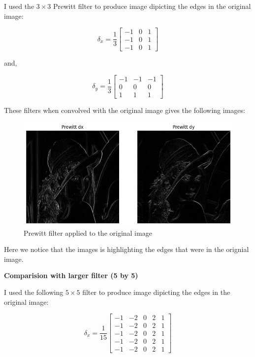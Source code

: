 I used the $3\times3$ Prewitt filter to produce image dipicting the edges in the original image:

$$\delta_x = \frac{1}{3}
\begin{bmatrix}
    -1 & 0 & 1 \\
    -1 & 0 & 1 \\
    -1 & 0 & 1
\end{bmatrix}$$

and,

$$\delta_y = \frac{1}{3}
\begin{bmatrix}
-1 & -1 & -1 \\
0 & 0 & 0 \\
1 & 1 & 1
\end{bmatrix}$$

These filters when convolved with the original image gives the following images:

\begin{figure}[H]
    \includegraphics[width=1.06\textwidth]{res/1_prewitt.png}
    \caption{Prewitt filter applied to the original image}\label{fig:1_prewitt}
\end{figure}

Here we notice that the images is highlighting the edges that were in the orignial image.

\textbf{Comparision with larger filter (5 by 5)}

I used the following $5\times5$ filter to produce image dipicting the edges in the original image:

$$\delta_x = \frac{1}{15}
\begin{bmatrix}
-1 & -2 & 0 & 2 & 1 \\
-1 & -2 & 0 & 2 & 1 \\
-1 & -2 & 0 & 2 & 1 \\
-1 & -2 & 0 & 2 & 1 \\
-1 & -2 & 0 & 2 & 1
\end{bmatrix}$$

